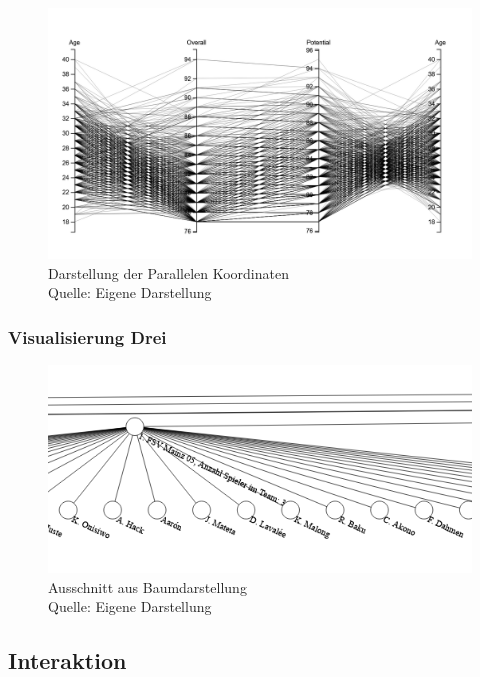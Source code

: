 \documentclass[usegeometry=true]{scrartcl}
\begin{document}
\begin{figure}[h]
\centering
\includegraphics[scale=0.4]{grafiken/ParalleleKoordinaten1}
\caption{Darstellung der Parallelen Koordinaten\\ Quelle: Eigene Darstellung}
\end{figure}






\subsubsection{Visualisierung Drei}
\begin{figure}[h]
\centering
\includegraphics[scale=0.4]{grafiken/BaumDiagram1}
\caption{Ausschnitt aus Baumdarstellung\\ Quelle: Eigene Darstellung}
\end{figure}


\subsection{Interaktion}
\end{document}
